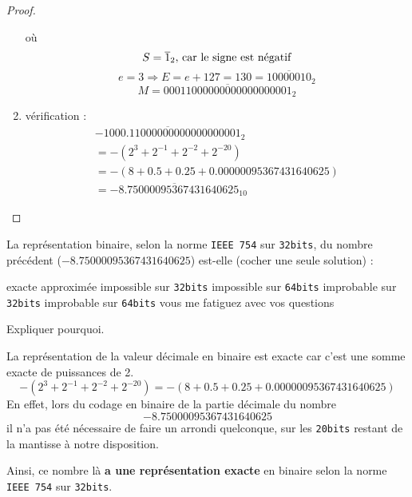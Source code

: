 \documentclass[12pt,a4paper,oneside,titlepage,final]{exam}
\begin{document}
\begin{questions}
\begin{solution}[30cm]
\begin{proof}
\begin{enumerate}
                        o\`u
                $$ S = \overline{1}_{2} \textnormal{, car le signe est n\'egatif} $$
                $$ e = 3 \Rightarrow E = e + 127 = 130 = \overline{10000010}_{2} $$
                $$ M = \overline{00011000000000000000001}_{2} $$
                \item vérification :
                \begin{multline}
                    \overline{-1000.11000000000000000001}_{2} \\= -
                    (2^3 + 2^{-1} + 2^{-2} + 2^{-20}) \\= - (8 + 0.5
                    +0.25+0.00000095367431640625) \\=
                    \overline{-8.75000095367431640625}_{10}
                \end{multline}
            \end{enumerate}
        \end{proof}
    \end{solution}

    \bonusquestion[1] La représentation binaire, selon la norme
    \texttt{\acrshort{IEEE} 754} sur \lstinline{32bits}, du nombre précédent ($ -8.75000095367431640625 $)
    est-elle (cocher une seule solution) :
    \begin{checkboxes}
        \CorrectChoice exacte
        \choice approximée
        \choice impossible sur \lstinline{32bits}
        \choice impossible sur \lstinline{64bits}
        \choice improbable sur \lstinline{32bits}
        \choice improbable sur \lstinline{64bits}
        \choice vous me fatiguez avec vos questions
    \end{checkboxes}

    \bonusquestion[2] Expliquer pourquoi.
    \begin{solutionorlines}[10cm]
        La représentation de la valeur décimale en binaire est exacte
        car c'est une somme exacte de puissances de 2.
        $$ -(2^3 + 2^{-1} + 2^{-2} + 2^{-20}) = - (8 +0.5+0.25+0.00000095367431640625) $$
        En effet, lors du codage en binaire de la partie décimale du
        nombre $$ -8.75000095367431640625 $$ il n'a pas été nécessaire
        de faire un arrondi quelconque, sur les \lstinline{20bits}
        restant de la mantisse à notre disposition.

        Ainsi, ce nombre là \textbf{a une représentation exacte} en
        binaire selon la norme \texttt{\acrshort{IEEE} 754} sur
        \lstinline{32bits}.
    \end{solutionorlines}
\end{questions}

\printbibheading
\printbibliography[check=online,heading=subbibliography,title={Webographiques}]

\printglossaries
\end{document}
